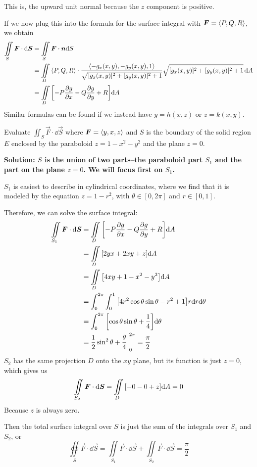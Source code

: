This is, the upward unit normal because the $z$ component is positive. \par
If we now plug this into the formula for the surface integral with $\boldsymbol{F} = \left\langle P,Q,R\right\rangle$, we obtain
\begin{align*}
    \iint\limits_S \vec F \cdot \dd \vec S &= \iint\limits_S \vec F \cdot \vec n \dd S \\
    &= \iint\limits_D \<P, Q, R\> \cdot \frac{\< -g_x(x,y), -g_y(x,y), 1\>}{\sqrt{[g_x(x,y)]^2+[g_y(x,y)]^2+1}} \sqrt{[g_x(x,y)]^2+[g_y(x,y)]^2+1}\, \dd A \\
    &= \iint\limits_D \bqty{-P\pdv{g}{x} - Q\pdv{g}{y} + R}\dd A
\end{align*}
Similar formulas can be found if we instead have $y = h(x,z)$ or $z=k(x,y)$.
\begin{example}
    Evaluate $\iint_S \vec F \cdot \dd \vec S$ where $\boldsymbol{F} = \left\langle y, x, z\right\rangle$ and $S$ is the boundary of the solid region $E$ enclosed by the paraboloid $z=1-x^2-y^2$ and the plane $z=0$. \par
    \bf{Solution:} $S$ is the union of two parts--the paraboloid part $S_1$ and the part on the plane $z=0$. We will focus first on $S_1$. \par 
    $S_1$ is easiest to describe in cylindrical coordinates, where we find that it is modeled by the equation $z = 1-r^2$, with $\theta\in[0,2\pi]$ and $r\in[0, 1]$. \par
    Therefore, we can solve the surface integral:
    \begin{align*}
        \iint\limits_{S_1} \vec F \cdot \dd \vec S &= \iint\limits_D \bqty{-P\pdv{g}{x} - Q\pdv{g}{y} + R}\dd A \\
        &= \iint\limits_D \bqty{2yx + 2xy + z}\dd A \\
        &= \iint\limits_D \bqty{4xy+1-x^2-y^2}\dd A \\
        &= \int_0^{2\pi}\int_0^1\bqty{4r^2\cos\theta\sin\theta - r^2 + 1}r\dd r\dd \theta \\
        &= \int_0^{2\pi} \bqty{\cos\theta\sin\theta + \frac{1}{4}}\dd \theta \\
        &= \frac{1}{2}\sin^2\theta + \frac{\theta}{4} \biggr|_0^{2\pi} = \frac{\pi}{2}
    \end{align*}
    $S_2$ has the same projection $D$ onto the $xy$ plane, but its function is just $z=0$, which gives us
    \[ \iint\limits_{S_2}\vec F \cdot \dd \vec S = \iint\limits_D \bqty{-0-0+z}\dd A = 0\]
    Because $z$ is always zero. \par
    Then the total surface integral over $S$ is just the sum of the integrals over $S_1$ and $S_2$, or
    \[ \oiint\limits_S \vec F \cdot \dd \vec S = \iint\limits_{S_1}\vec F \cdot \dd \vec S +\iint\limits_{S_2}\vec F \cdot \dd \vec S  = \frac{\pi}{2}\]
\end{example}
